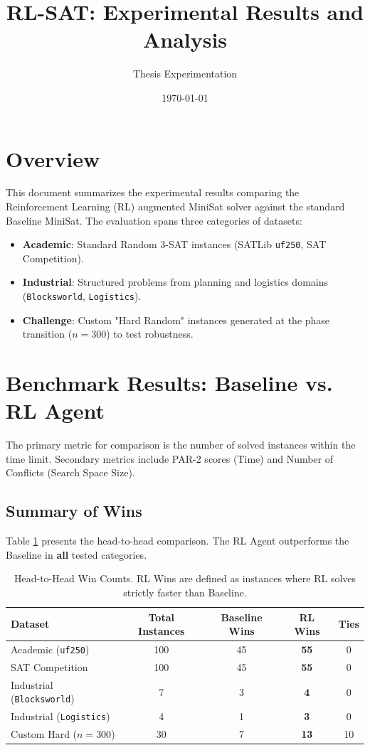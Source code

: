 \documentclass{article}
\title{RL-SAT: Experimental Results and Analysis}
\author{Thesis Experimentation}
\date{\today}
\begin{document}
\maketitle

\section{Overview}
This document summarizes the experimental results comparing the Reinforcement Learning (RL) augmented MiniSat solver against the standard Baseline MiniSat. The evaluation spans three categories of datasets:
\begin{itemize}
    \item \textbf{Academic}: Standard Random 3-SAT instances (SATLib \texttt{uf250}, SAT Competition).
    \item \textbf{Industrial}: Structured problems from planning and logistics domains (\texttt{Blocksworld}, \texttt{Logistics}).
    \item \textbf{Challenge}: Custom "Hard Random" instances generated at the phase transition ($n=300$) to test robustness.
\end{itemize}

\section{Benchmark Results: Baseline vs. RL Agent}

The primary metric for comparison is the number of solved instances within the time limit. Secondary metrics include PAR-2 scores (Time) and Number of Conflicts (Search Space Size).

\subsection{Summary of Wins}
Table \ref{tab:overall_results} presents the head-to-head comparison. The RL Agent outperforms the Baseline in \textbf{all} tested categories.

\begin{table}[h]
    \centering
    \begin{tabular}{lcccc}
        \toprule
        \textbf{Dataset} & \textbf{Total Instances} & \textbf{Baseline Wins} & \textbf{RL Wins} & \textbf{Ties} \\
        \midrule
        Academic (\texttt{uf250}) & 100 & 45 & \textbf{55} & 0 \\
        SAT Competition & 100 & 45 & \textbf{55} & 0 \\
        Industrial (\texttt{Blocksworld}) & 7 & 3 & \textbf{4} & 0 \\
        Industrial (\texttt{Logistics}) & 4 & 1 & \textbf{3} & 0 \\
        Custom Hard ($n=300$) & 30 & 7 & \textbf{13} & 10 \\
        \bottomrule
    \end{tabular}
    \caption{Head-to-Head Win Counts. RL Wins are defined as instances where RL solves strictly faster than Baseline.}
    \label{tab:overall_results}
\end{table}
\end{document}
